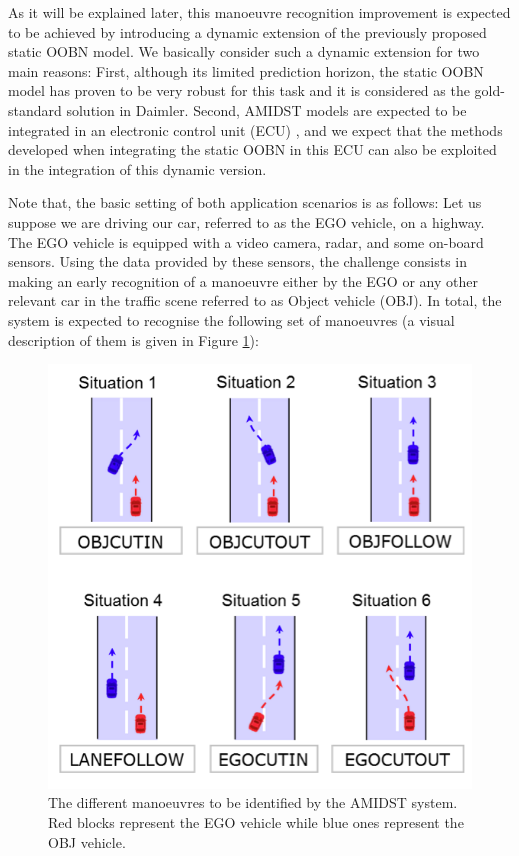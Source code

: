 As it will be explained later, this manoeuvre recognition improvement is expected to be achieved by introducing a dynamic extension of the previously proposed static OOBN model. We basically consider such a dynamic extension for two main reasons: First, although its limited prediction horizon, the static OOBN model has proven to be very robust for this task and it is considered as the gold-standard solution in Daimler. Second, AMIDST models are expected to be integrated in an electronic control unit (ECU) \cite{Fer14}, and we expect that the methods developed when integrating the static OOBN in this ECU \cite{Weidl2014} can also be exploited in the integration of this dynamic version. 

Note that, the basic setting of both application scenarios is as follows: Let us suppose we are driving our car, referred to as the EGO vehicle, on a highway. The EGO vehicle is equipped with a video camera, radar, and some on-board sensors. Using the data provided by these sensors, the challenge consists in making an early recognition of a manoeuvre either by the EGO or any other relevant car in the traffic scene referred to as Object vehicle (OBJ). In total, the system is expected to recognise the following set of manoeuvres (a visual description of them is given in Figure \ref{Figure:DaimlerManeuvers}):

\begin{figure}[ht!]
\begin{center}
\includegraphics[scale=0.4]{./figures/DaimlerManeuvers}
\caption{\label{Figure:DaimlerManeuvers}The different manoeuvres to be identified by the AMIDST system. Red blocks represent the EGO vehicle while blue ones represent the OBJ vehicle.}
\end{center}
\end{figure}

